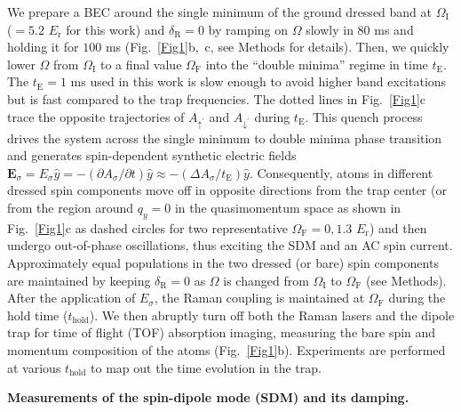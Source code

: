 \documentclass[showpacs,preprintnumbers,amsmath,amssymb, superscriptaddress, aps, reprint]{revtex4-1}
\def\E_r{E_{\text{r}}}
\def\deltaR{\delta_{\text{R}}}
\def\OmegaF{\Omega_{\text{F}}}
\def\OmegaI{\Omega_{\text{I}}}
\def\thold{t_{\text{hold}}}
\begin{document}
{We prepare a BEC around the single minimum of the ground dressed band at $\OmegaI$ ($= 5.2$ $\E_r$ for this work) and $\deltaR= 0$ by ramping on $\Omega$ slowly in $80$ ms and holding it for $100$ ms (Fig.~\ref{Fig1}b,~c, {see Methods for details}). Then, we quickly lower $\Omega$ from $\OmegaI$ to a final value $\OmegaF$ into the “double minima” regime in time $t_{\text{E}}$. The $t_{\text{E}} = 1$ ms used in this work is slow enough to avoid higher band excitations but is fast compared to the trap frequencies. The dotted lines in Fig.~\ref{Fig1}c trace the opposite trajectories of $A_{\uparrow ^{'}}$ and $A_{\downarrow ^{'}}$ during $t_{\text{E}}$. 
This quench process drives the system across the single minimum to double minima phase transition and generates spin-dependent synthetic electric fields $\textbf{E}_\sigma=E_\sigma\hat{y}=-(\partial {A_\sigma }/\partial t) \hat{y}\approx -(\Delta {A_\sigma }/{t_{\text{E}}})\hat{y}$. Consequently, atoms in different dressed spin components move off in opposite directions from the trap center (or from the region around $q_y=0$ in the quasimomentum space as shown in Fig.~\ref{Fig1}c as dashed circles for two representative $\OmegaF = 0, 1.3$ $\E_r$) and then undergo out-of-phase oscillations, thus exciting the SDM and an AC spin current. Approximately equal populations in the two dressed (or bare) spin components are maintained by keeping $\deltaR= 0$ as $\Omega$ is changed from $\OmegaI$ to $\OmegaF$ ({see Methods}). After the application of $E_{\sigma}$, the Raman coupling is maintained at $\OmegaF$ during the hold time ($\thold$). We then abruptly turn off both the Raman lasers and the dipole trap for time of flight (TOF) absorption imaging, measuring the bare spin and momentum composition of the atoms (Fig.~\ref{Fig1}b). Experiments are performed at various $\thold$ to map out the time evolution in the trap.


\vspace{5mm}

\textbf{Measurements of the spin-dipole mode (SDM) and its damping.} 

}
\end{document}
